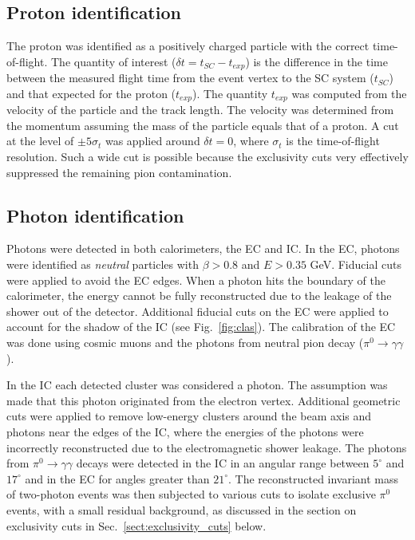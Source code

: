 \documentclass[prc,floatfix,twocolumn,superscriptaddress,letter]{revtex4}
\begin{document}
\subsection{Proton identification} 
The proton was identified as a positively charged particle with the correct time-of-flight.
The  quantity of interest  ($\delta t=t_{SC}-t_{exp}$) is the difference in the time between the measured flight time from the event vertex to the SC system ($t_{SC}$) and that expected for the proton ($t_{exp}$). The quantity $t_{exp}$ was computed from the velocity of the particle and the track length. The velocity was determined from the momentum assuming the mass of the  particle equals that of a proton.  A cut at the level of $\pm 5 \sigma_t$ was applied around  $\delta t = 0$, where  $\sigma_t$  is the time-of-flight resolution.
Such a wide cut is possible because the exclusivity cuts very effectively suppressed the remaining pion contamination. 





\subsection{Photon identification} 

Photons were detected in both calorimeters, the EC  and IC. 
In the EC, photons  were identified as {\it neutral} particles  with $\beta>0.8$ and $E>0.35$ GeV. 
Fiducial cuts were applied to avoid  the EC  edges. When a photon hits the boundary of the calorimeter, the energy cannot be fully reconstructed due to the leakage of the shower out of the detector.
Additional fiducial cuts on the EC  were applied to account for the shadow of the IC  (see Fig.~\ref{fig:clas}). 
The  calibration of the EC  was done using cosmic muons and  the photons from neutral pion decay ($\pi^0\to\gamma\gamma$).  


In the IC   each detected cluster was considered  a photon. The assumption was made that this photon originated from the electron vertex. Additional geometric cuts were applied to remove low-energy clusters around the beam axis and photons near the edges of the IC, where the energies of the photons were incorrectly reconstructed due to the electromagnetic shower leakage.
The photons from $\pi^0\to \gamma\gamma$ decays were detected in the IC  in an angular range between $5^\circ$  and $17^\circ$   and in the EC   for angles greater than $21^\circ$. 
The reconstructed invariant mass of two-photon events was then subjected to various cuts to isolate exclusive $\pi^0$ events, with a small residual background, as discussed in the section on exclusivity cuts in Sec.~\ref{sect:exclusivity_cuts} below.  
\end{document}
